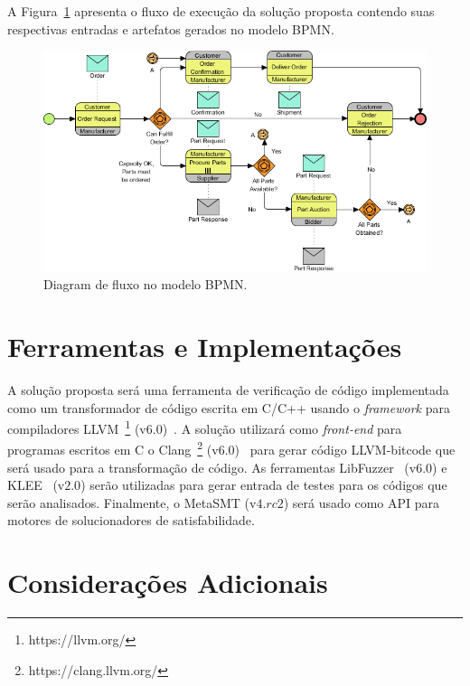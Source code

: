 A Figura~\ref{fig_digflow} apresenta o fluxo de execução da solução proposta contendo suas respectivas entradas e artefatos gerados no modelo BPMN.

\begin{figure}[h!]
	\caption{\label{fig_digflow}Diagram de fluxo no modelo BPMN.}
	\begin{center}
	    \includegraphics[scale=0.7]{images/34-final-business-process-diagram.png}
	\end{center}
\end{figure}


\section{Ferramentas e Implementações}


A solução proposta será uma ferramenta de verificação de código implementada como um transformador de código escrita em C/C++ usando o \textit{framework} para compiladores LLVM~\footnote{https://llvm.org/} (v$6.0$)~\cite{Lattner:2004}. A solução utilizará como \textit{front-end} para programas escritos em C o Clang~\footnote{https://clang.llvm.org/} (v$6.0$)~\cite{Fandrey:2010} para gerar código LLVM-bitcode que será usado para a transformação de código. As ferramentas LibFuzzer~\cite{libfuzzer:2018} (v$6.0$) e KLEE~\cite{Cadar:2008:KUA} (v$2.0$) serão utilizadas para gerar entrada de testes para os códigos que serão analisados. Finalmente, o MetaSMT (v$4.rc2$) será usado como API para motores de solucionadores de satisfabilidade.


\section{Considerações Adicionais}

